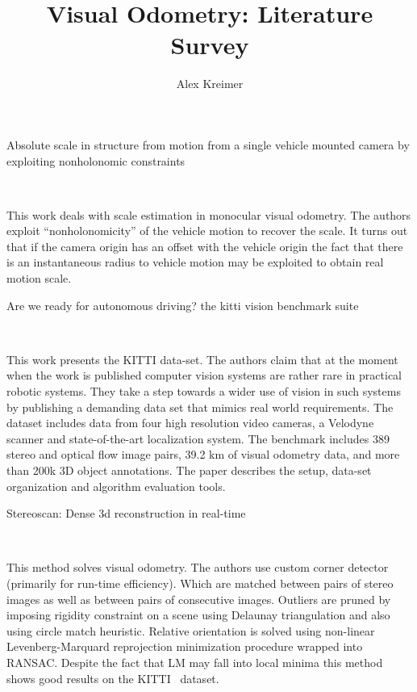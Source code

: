 \documentclass[10pt]{article}         %
\title{Visual Odometry: Literature Survey}
\author{Alex Kreimer}
\begin{document}
\maketitle

\begin{abstract}
\end{abstract}

\begin{enumerate}

  {\Large \item Absolute scale in structure from motion from a single
    vehicle mounted camera by exploiting nonholonomic
    constraints}~\cite{scaramuzza2009absolute}
  
  This work deals with scale estimation in monocular visual odometry.
  The authors exploit ``nonholonomicity'' of the vehicle motion to
  recover the scale.  It turns out that if the camera origin has an
  offset with the vehicle origin the fact that there is an
  instantaneous radius to vehicle motion may be exploited to obtain
  real motion scale.

  {\Large \item Are we ready for autonomous driving?  the kitti vision
    benchmark suite}~\cite{geiger2012we}

  This work presents the KITTI data-set.  The authors claim that at
  the moment when the work is published computer vision systems are
  rather rare in practical robotic systems.  They take a step towards
  a wider use of vision in such systems by publishing a demanding data
  set that mimics real world requirements.  The dataset includes data
  from four high resolution video cameras, a Velodyne scanner and
  state-of-the-art localization system.  The benchmark includes 389
  stereo and optical flow image pairs, 39.2 km of visual odometry
  data, and more than 200k 3D object annotations.  The paper describes
  the setup, data-set organization and algorithm evaluation tools.

  {\Large \item Stereoscan: Dense 3d reconstruction in
    real-time}~\cite{geiger2011stereoscan}
  
  This method solves visual odometry.  The authors use custom corner
  detector (primarily for run-time efficiency).  Which are matched
  between pairs of stereo images as well as between pairs of
  consecutive images.  Outliers are pruned by imposing rigidity
  constraint on a scene using Delaunay triangulation and also using
  circle match heuristic.  Relative orientation is solved using
  non-linear Levenberg-Marquard reprojection minimization procedure
  wrapped into RANSAC.  Despite the fact that LM may fall into local
  minima this method shows good results on the
  KITTI~\cite{geiger2012we} dataset.


\end{enumerate}
\end{document}
